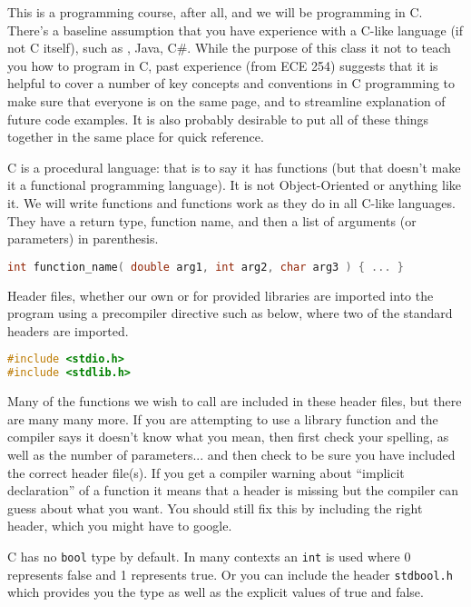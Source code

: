 This is a programming course, after all, and we will be programming in C. There's a baseline assumption that you have experience with a C-like language (if not C itself), such as \Cpp, Java, C\#. While the purpose of this class it not to teach you how to program in C, past experience (from ECE 254) suggests that it is helpful to cover a number of key concepts and conventions in C programming to make sure that everyone is on the same page, and to streamline explanation of future code examples. It is also probably desirable to put all of these things together in the same place for quick reference.

C is a procedural language: that is to say it has functions (but that doesn't make it a functional programming language). It is not Object-Oriented or anything like it. We will write functions and functions work as they do in all C-like languages. They have a return type, function name, and then a list of arguments (or parameters) in parenthesis.

\begin{lstlisting}[language=C]
int function_name( double arg1, int arg2, char arg3 ) { ... }
\end{lstlisting}

Header files, whether our own or for provided libraries are imported into the program using a precompiler directive such as below, where two of the standard headers are imported.

\begin{lstlisting}[language=C]
#include <stdio.h>
#include <stdlib.h>
\end{lstlisting}

Many of the functions we wish to call are included in these header files, but there are many many more. If you are attempting to use a library function and the compiler says it doesn't know what you mean, then first check your spelling, as well as the number of parameters... and then check to be sure you have included the correct header file(s). If you get a compiler warning about ``implicit declaration'' of a function it means that a header is missing but the compiler can guess about what you want. You should still fix this by including the right header, which you might have to google.

C has no \texttt{bool} type by default. In many contexts an \texttt{int} is used where 0 represents false and 1 represents true. Or you can include the header \texttt{stdbool.h}  which provides you the type as well as the explicit values of true and false.

